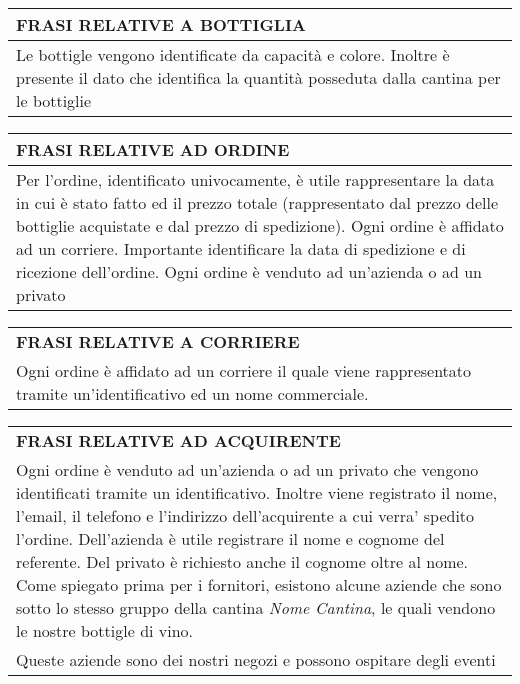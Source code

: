 \begin{center}
	\vspace{0.5cm}
	
	\begin{tabular}{P{16cm}}
		\toprule
		 \textbf {\large {FRASI RELATIVE A BOTTIGLIA}} \\
		\midrule
		Le bottigle vengono identificate da capacità e colore. Inoltre è presente il dato che identifica la quantità posseduta dalla cantina per le bottiglie\\
		\bottomrule
	\end{tabular}
	
	\vspace{0.5cm}
	
	\begin{tabular}{P{16cm}}
		\toprule
		 \textbf {\large {FRASI RELATIVE AD ORDINE}} \\
		\midrule
		Per l'ordine, identificato univocamente, è utile rappresentare la data in cui è stato fatto ed il prezzo totale (rappresentato dal prezzo delle bottiglie acquistate e dal prezzo di spedizione). Ogni ordine è affidato ad un corriere. Importante identificare la data  di spedizione e di ricezione dell'ordine. Ogni ordine è venduto ad un'azienda o ad un privato\\
		\bottomrule
	\end{tabular}
	
	\vspace{0.5cm}
	
	\begin{tabular}{P{16cm}}
		\toprule
		 \textbf {\large {FRASI RELATIVE A CORRIERE}} \\
		Ogni ordine è affidato ad un corriere il quale viene rappresentato tramite un'identificativo ed un nome commerciale.\\
		\bottomrule
	\end{tabular}
	
	\vspace{0.5cm}
	
	\begin{tabular}{P{16cm}}
		\toprule
		 \textbf {\large {FRASI RELATIVE AD ACQUIRENTE}} \\
		Ogni ordine è venduto ad un'azienda o ad un privato che vengono identificati tramite un identificativo. Inoltre viene registrato il nome, l'email, il telefono e l'indirizzo dell'acquirente a cui verra' spedito l'ordine. Dell'azienda è utile registrare il nome e cognome del referente. Del privato è richiesto anche il cognome oltre al nome. Come spiegato prima per i fornitori, esistono alcune aziende che sono sotto lo stesso gruppo della cantina \emph{Nome Cantina}, le quali vendono le nostre bottigle di vino.\\
Queste aziende sono dei nostri negozi e possono ospitare degli eventi\\
		\bottomrule
	\end{tabular}
	

\end{center}
